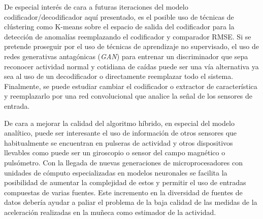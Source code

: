 De especial interés de cara a futuras iteraciones del modelo codificador/decodificador aquí presentado, es el posible uso de técnicas de clústering como K-means sobre el espacio de salida del codificador para la detección de anomalías reemplazando el codificador y comparador RMSE. Si se pretende proseguir por el uso de técnicas de aprendizaje no supervisado, el uso de redes generativas antagónicas (\textit{GAN}) para entrenar un discriminador que sepa reconocer actividad normal y cotidiana de caídas puede ser una vía alternativa ya sea al uso de un decodificador o directamente reemplazar todo el sistema. Finalmente, se puede estudiar cambiar el codificador o extractor de característica y reemplazarlo por una red convolucional que analice la señal de los sensores de entrada.

De cara a mejorar la calidad del algoritmo híbrido, en especial del modelo analítico, puede ser interesante el uso de información de otros sensores que habitualmente se encuentran en pulseras de actividad y otros dispositivos llevables como puede ser un giroscopio o sensor del campo magnético o pulsómetro. Con la llegada de nuevas generaciones de microprocesadores con unidades de cómputo especializadas en modelos neuronales se facilita la posibilidad de aumentar la complejidad de estos y permitir el uso de entradas compuestas de varias fuentes. Este incremento en la diversidad de fuentes de datos debería ayudar a paliar el problema de la baja calidad de las medidas de la aceleración realizadas en la muñeca como estimador de la actividad.


